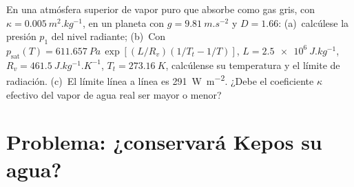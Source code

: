\begin{exercise}[$\star\star\star$]\label{exo:b3:planetary-atmospheres:12}
En una atmósfera superior de vapor puro que absorbe como gas gris, con $\kappa =
\qty{0.005}{m^2.kg^{-1}}$, en un planeta con $g = \qty{9.81}{m.s^{-2}}$
y $D = 1.66$: (a)~calcúlese la presión $p_1$ del nivel radiante;
(b)~Con $p_\mathrm{sat}(T) = \qty{611.657}{Pa}\,\exp[(L/R_v)(1/T_t -
1/T)]$, $L = \qty{2.5e6}{J.kg^{-1}}$, $R_v = \qty{461.5}{J.kg^{-1}.K^{-1}}$,
$T_t = \qty{273.16}{K}$, calcúlense su temperatura y el límite de radiación.
(c)~El límite línea a línea es \qty{291}{W.m^{-2}}. ¿Debe el coeficiente
$\kappa$ efectivo del vapor de agua real ser mayor o menor?
\end{exercise}

\section{Problema: ¿conservará Kepos su agua?}

